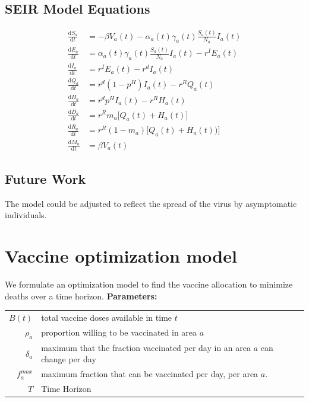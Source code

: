 \documentclass{article}
\begin{document}







\subsection{SEIR Model Equations}
\begin{align}
    \frac{\text{d}S_a}{\text{d}t}&=  -\beta V_a(t) - \alpha_a(t) \gamma_a(t)\frac{S_a(t)}{N_a}I_a(t) \label{eq:S}\\
     \frac{\text{d}E_a}{\text{d}t} &= \alpha_a(t) \gamma_a(t)\frac{S_a(t)}{N_a}I_a(t) -r^IE_a(t) \label{eq:E} \\
     \frac{\text{d}I_a}{\text{d}t}&= r^IE_a(t) - r^dI_a(t)\\
    \frac{\text{d}Q_a}{\text{d}t} &= r^d(1-p^H)I_a(t) - r^RQ_a(t) \\
    \frac{\text{d}H_a}{\text{d}t} &= r^dp^HI_a(t) - r^RH_a(t)\\
    \frac{\text{d}D_a}{\text{d}t} &= r^Rm_a\Big[Q_a(t)+H_a(t)\Big]\\
    \frac{\text{d}R_a}{\text{d}t} &= r^R(1-m_a)\Big[Q_a(t)+H_a(t))\Big]\\
    \frac{\text{d}M_a}{\text{d}t} &= \beta V_a(t) \label{eq:M}
\end{align}

\subsection{Future Work}
The model could be adjusted to reflect the spread of the virus by asymptomatic individuals.




\section{Vaccine optimization model}
We formulate an optimization model to find the vaccine allocation to minimize deaths over a time horizon. %
\textbf{Parameters:}\\
\begin{tabular}{rl}
$B(t) $ &total vaccine doses available in time $t$\\
$\rho_a$ &proportion willing to be vaccinated in area $a$\\
$\delta_a$ &maximum that the fraction vaccinated per day in an area $a$ can change per day\\
$f_a^{max}$ &maximum fraction that can be vaccinated per day, per area $a$.    \\
$T$ &Time Horizon
\end{tabular}\\
\end{document}
